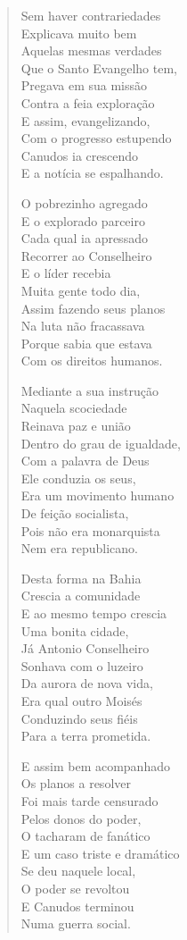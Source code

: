 \begin{verse}
Sem haver contrariedades\\
Explicava muito bem\\
Aquelas mesmas verdades\\
Que o Santo Evangelho tem,\\
Pregava em sua missão\\
Contra a feia exploração\\
E assim, evangelizando,\\
Com o progresso estupendo\\
Canudos ia crescendo\\
E a notícia se espalhando.

O pobrezinho agregado\\
E o explorado parceiro\\
Cada qual ia apressado\\
Recorrer ao Conselheiro\\
E o líder recebia\\
Muita gente todo dia,\\
Assim fazendo seus planos\\
Na luta não fracassava\\
Porque sabia que estava\\
Com os direitos humanos.

Mediante a sua instrução\\
Naquela scociedade\\
Reinava paz e união\\
Dentro do grau de igualdade,\\
Com a palavra de Deus\\
Ele conduzia os seus,\\
Era um movimento humano\\
De feição socialista,\\
Pois não era monarquista\\
Nem era republicano.

Desta forma na Bahia\\
Crescia a comunidade\\
E ao mesmo tempo crescia\\
Uma bonita cidade,\\
Já Antonio Conselheiro\\
Sonhava com o luzeiro\\
Da aurora de nova vida,\\
Era qual outro Moisés\\
Conduzindo seus fiéis\\
Para a terra prometida.

E assim bem acompanhado\\
Os planos a resolver\\
Foi mais tarde censurado\\
Pelos donos do poder,\\
O tacharam de fanático\\
E um caso triste e dramático\\
Se deu naquele local,\\
O poder se revoltou\\
E Canudos terminou\\
Numa guerra social.


\end{verse}
